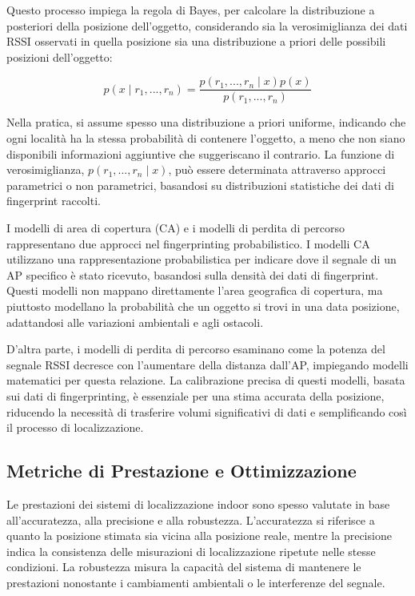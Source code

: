 \noindent Questo processo impiega la regola di Bayes, per calcolare la distribuzione a posteriori della posizione dell'oggetto, considerando sia la verosimiglianza dei dati RSSI osservati in quella posizione sia una distribuzione a priori delle possibili posizioni dell'oggetto:

\begin{equation}
    p(x \mid r_1, ..., r_n) = \frac{p(r_1, ..., r_n \mid x) p(x)}{p(r_1, ..., r_n)}
\end{equation}

\noindent Nella pratica, si assume spesso una distribuzione a priori uniforme, indicando che ogni località ha la stessa probabilità di contenere l'oggetto, a meno che non siano disponibili informazioni aggiuntive che suggeriscano il contrario. La funzione di verosimiglianza, $ p(r_1, ..., r_n \mid x) $, può essere determinata attraverso approcci parametrici o non parametrici, basandosi su distribuzioni statistiche dei dati di fingerprint raccolti.

I modelli di area di copertura (CA) e i modelli di perdita di percorso rappresentano due approcci nel fingerprinting probabilistico. I modelli CA utilizzano una rappresentazione probabilistica per indicare dove il segnale di un AP specifico è stato ricevuto, basandosi sulla densità dei dati di fingerprint. Questi modelli non mappano direttamente l'area geografica di copertura, ma piuttosto modellano la probabilità che un oggetto si trovi in una data posizione, adattandosi alle variazioni ambientali e agli ostacoli.

D'altra parte, i modelli di perdita di percorso esaminano come la potenza del segnale RSSI decresce con l'aumentare della distanza dall'AP, impiegando modelli matematici per questa relazione. La calibrazione precisa di questi modelli, basata sui dati di fingerprinting, è essenziale per una stima accurata della posizione, riducendo la necessità di trasferire volumi significativi di dati e semplificando così il processo di localizzazione.

\subsection{Metriche di Prestazione e Ottimizzazione}
\hspace{\parindent}Le prestazioni dei sistemi di localizzazione indoor sono spesso valutate in base all'accuratezza, alla precisione e alla robustezza. L'accuratezza si riferisce a quanto la posizione stimata sia vicina alla posizione reale, mentre la precisione indica la consistenza delle misurazioni di localizzazione ripetute nelle stesse condizioni. La robustezza misura la capacità del sistema di mantenere le prestazioni nonostante i cambiamenti ambientali o le interferenze del segnale.

